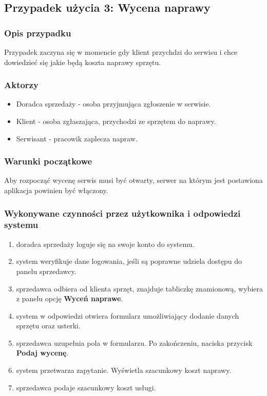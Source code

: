 \documentclass{article}
\begin{document}
\subsection{Przypadek użycia 3: Wycena naprawy}
\subsubsection{Opis przypadku}
Przypadek zaczyna się w momencie gdy klient przychdzi do serwisu i chce dowiedzieć się jakie będą koszta naprawy sprzętu.
\subsubsection{Aktorzy}
\begin{itemize}
    \item Doradca sprzedaży - osoba przyjmująca zgłoszenie w serwisie.
    \item Klient - osoba zgłaszająca, przychodzi ze sprzętem do naprawy.
    \item Serwisant - pracowik zaplecza napraw.
\end{itemize}
\subsubsection{Warunki początkowe}
Aby rozpocząć wycenę serwis musi być otwarty, serwer na którym jest postawiona aplikacja powinien być włączony.
\subsubsection{Wykonywane czynności przez użytkownika i odpowiedzi systemu}
\begin{enumerate}
    \item doradca sprzedaży loguje się na swoje konto do systemu.
    \item system weryfikuje dane logowania, jeśli są poprawne udziela dostępu do panelu sprzedawcy.
    \item sprzedawca odbiera od klienta sprzęt, znajduje tabliczkę znamionową, wybiera z panelu opcję \textbf{Wyceń naprawe}.
    \item system w odpowiedzi otwiera formularz umożliwiający dodanie danych sprzętu oraz usterki.
    \item sprzedawca uzupełnia pola w formularzu. Po zakończeniu, naciska przycisk \textbf{Podaj wycenę}.
    \item system przetwarza zapytanie. Wyświetla szacunkowy koszt naprawy.
    \item sprzedawca podaje szacunkowy koszt usługi.
\end{enumerate}
\end{document}
